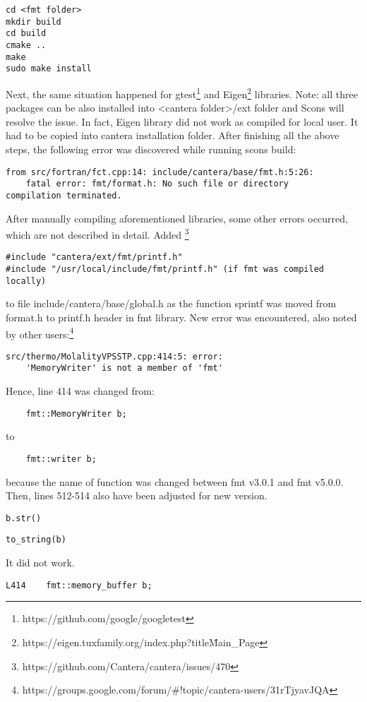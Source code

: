 \documentclass[12pt,english]{article}
\begin{document}
\begin{lstlisting}
cd <fmt folder>
mkdir build
cd build
cmake ..
make 
sudo make install
\end{lstlisting}
Next, the same situation happened for gtest\footnote{https://github.com/google/googletest} and Eigen\footnote{https://eigen.tuxfamily.org/index.php?title\=Main\_Page} libraries. {{{Note: all three packages can be also installed into <cantera folder>/ext folder and Scons will resolve the issue}}}. In fact, Eigen library did not work as compiled for local user. It had to be copied into cantera installation folder. After finishing all the above steps, the following error was discovered while running scons build:
\begin{lstlisting}
from src/fortran/fct.cpp:14: include/cantera/base/fmt.h:5:26: 
	fatal error: fmt/format.h: No such file or directory
compilation terminated.
\end{lstlisting}
After manually compiling aforementioned libraries, some other errors occurred, which are not described in detail.	
Added \footnote{https://github.com/Cantera/cantera/issues/470}
\begin{lstlisting}
#include "cantera/ext/fmt/printf.h"
#include "/usr/local/include/fmt/printf.h" (if fmt was compiled locally)
\end{lstlisting}
to file include/cantera/base/global.h as the function sprintf was moved from format.h to printf.h header in fmt library.
New error was encountered, also noted by other users:\footnote{https://groups.google.com/forum/\#!topic/cantera-users/31rTjyavJQA}
\begin{lstlisting}
src/thermo/MolalityVPSSTP.cpp:414:5: error: 
	'MemoryWriter' is not a member of 'fmt'
\end{lstlisting}
Hence, line 414 was changed from:
\begin{lstlisting}
    fmt::MemoryWriter b;
\end{lstlisting}
to
\begin{lstlisting}
    fmt::writer b;
\end{lstlisting}
because the name of function was changed between fmt v3.0.1 and fmt v5.0.0. Then, lines 512-514 also have been adjusted for new version.
\begin{lstlisting}
b.str()
\end{lstlisting}
\begin{lstlisting}
to_string(b)
\end{lstlisting}
It did not work.
\begin{lstlisting}
L414    fmt::memory_buffer b;
\end{lstlisting}
\end{document}
